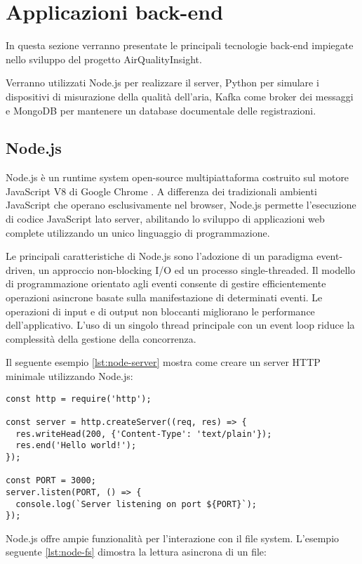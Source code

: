 \section{Applicazioni back-end}

In questa sezione verranno presentate le principali tecnologie back-end impiegate nello sviluppo del progetto
AirQualityInsight.

Verranno utilizzati Node.js per realizzare il server, Python per simulare i dispositivi di misurazione della
qualità dell'aria, Kafka come broker dei messaggi e MongoDB per mantenere un database documentale delle registrazioni.

\subsection{Node.js}

Node.js è un runtime system open-source multipiattaforma costruito sul motore JavaScript V8
di Google Chrome \citep{capan_2013_nodejs}. A differenza dei tradizionali ambienti JavaScript che operano esclusivamente
nel browser, Node.js permette l'esecuzione di codice JavaScript lato server, abilitando lo sviluppo di applicazioni web
complete utilizzando un unico linguaggio di programmazione.

Le principali caratteristiche di Node.js sono l'adozione di un paradigma event-driven,
un approccio non-blocking I/O ed un processo single-threaded. Il modello di programmazione orientato agli eventi
consente di gestire efficientemente operazioni asincrone basate sulla manifestazione di determinati eventi.
Le operazioni di input e di output non bloccanti migliorano le performance dell'applicativo.
L'uso di un singolo thread principale con un event loop riduce la complessità della gestione della concorrenza.

Il seguente esempio \ref{lst:node-server} mostra come creare un server HTTP minimale utilizzando Node.js:

\begin{lstlisting}[caption={Server HTTP base in Node.js}, label=lst:node-server]
const http = require('http');

const server = http.createServer((req, res) => {
  res.writeHead(200, {'Content-Type': 'text/plain'});
  res.end('Hello world!');
});

const PORT = 3000;
server.listen(PORT, () => {
  console.log(`Server listening on port ${PORT}`);
});
\end{lstlisting}

Node.js offre ampie funzionalità per l'interazione con il file system.
L'esempio seguente \ref{lst:node-fs} dimostra la lettura asincrona di un file:

